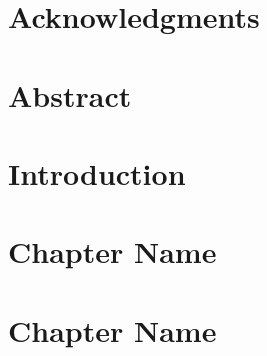 \documentclass[11pt]{book}
\renewcommand{\baselinestretch}{1.2}
\begin{document}



\newpage
\thispagestyle{empty}
\renewcommand{\thesisdedication}{{\large Copyright \copyright~~NAME, YEAR\\}{\large All Rights Reserved\\}}
\thesisdedicationpage



\newpage
\thispagestyle{empty}
\renewcommand{\thesisdedication}{\large To SOMEONE}
\thesisdedicationpage

\mastersthesis
\renewcommand{\baselinestretch}{1.5}

\chapter*{Acknowledgments}
\label{ch:ack}


\chapter*{Abstract}
\label{ch:abstract}


\tableofcontents
\listoffigures
\listoftables

\chapter{Introduction}
\label{ch:intro}



\chapter{Chapter Name}
\label{ch:chap2}



\chapter{Chapter Name}
\label{ch:chap3}


\end{document}
